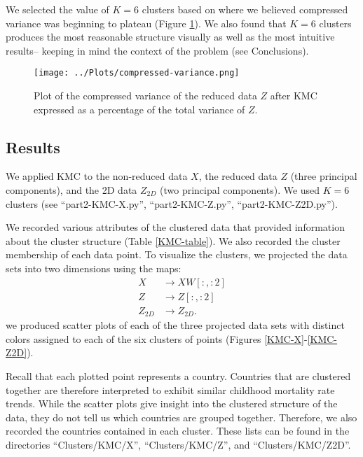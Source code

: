 \documentclass[12pt]{article}
\begin{document}
We selected the value of $K=6$ clusters based on where we believed compressed variance was beginning to plateau (Figure \ref{compressed-variance}). We also found that $K=6$ clusters produces the most reasonable structure visually as well as the most intuitive results-- keeping in mind the context of the problem (see Conclusions).

\begin{figure}
\centering
\texttt{[image: ../Plots/compressed-variance.png]}
\caption{\label{compressed-variance} Plot of the compressed variance of the reduced data $Z$ after KMC expressed as a percentage of the total variance of $Z$.}
\end{figure}

\subsection{Results}

We applied KMC to the non-reduced data $X$, the reduced data $Z$ (three principal components), and the 2D data $Z_{2D}$ (two principal components). We used $K=6$ clusters (see ``part2-KMC-X.py'', ``part2-KMC-Z.py'', ``part2-KMC-Z2D.py'').

We recorded various attributes of the clustered data that provided information about the cluster structure (Table \ref{KMC-table}). We also recorded the cluster membership of each data point. To visualize the clusters, we projected the data sets into two dimensions using the maps:
\begin{align*}
X &\rightarrow X W[:, :2] \\
Z &\rightarrow Z[:, :2] \\
Z_{2D} &\rightarrow Z_{2D}.
\end{align*}
we produced scatter plots of each of the three projected data sets with distinct colors assigned to each of the six clusters of points (Figures \ref{KMC-X}-\ref{KMC-Z2D}).

Recall that each plotted point represents a country. Countries that are clustered together are therefore interpreted to exhibit similar childhood mortality rate trends. While the scatter plots give insight into the clustered structure of the data, they do not tell us which countries are grouped together. Therefore, we also recorded the countries contained in each cluster. These lists can be found in the directories ``Clusters/KMC/X'', ``Clusters/KMC/Z'', and ``Clusters/KMC/Z2D''.
\end{document}
